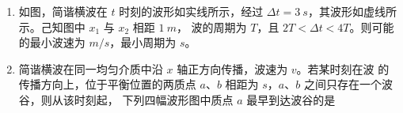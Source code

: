 \begin{enumerate}
\item 
{}
如图，简谐横波在 $ t $ 时刻的波形如实线所示，经过
$ \Delta t=3 \ s $，其波形如虚线所示。己知图中 $ x_{1} $ 与 $ x_{2} $ 相距 $ 1 \ m $，
波的周期为 $ T $，且 $ 2  T < \Delta t<4 T $。则可能的最小波速为
 \underlinegap 
$ m/s $，最小周期为 \underlinegap $ s $。
\begin{figure}[h!]
	\centering
	
\end{figure}


\item 
{}
简谐横波在同一均匀介质中沿 $ x $ 轴正方向传播，波速为 $ v $。若某时刻在波
的传播方向上，位于平衡位置的两质点 $ a $、$ b $ 相距为 $ s $，$ a $、$ b $ 之间只存在一个波谷，则从该时刻起，
下列四幅波形图中质点 $ a $ 最早到达波谷的是  
\pfourchoices
{}
{}
{}
{}



	
	
	
\end{enumerate}

